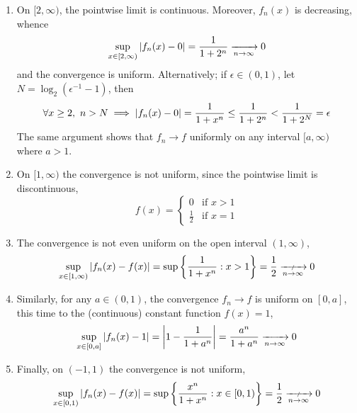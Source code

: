 \begin{examples}{}{}
\begin{enumerate}
	  \begin{enumerate}
	    \item On $[2,\infty)$, the pointwise limit is continuous. Moreover, $f_n(x)$ is decreasing, whence
	    \[
	    	\sup_{x\in[2,\infty)}\left| f_n(x)-0\right|=\frac 1{1+2^n}\xrightarrow[n\to\infty]{} 0
	    \]
	    and the convergence is uniform. Alternatively; if $\epsilon\in (0,1)$, let $N=\log_2(\epsilon^{-1}-1)$, then
	    \[
	    	\forall x\ge 2,\ n>N
	    	\implies \left| f_n(x)-0\right|=\frac 1{1+x^n}
	    	\le \frac 1{1+2^n}<\frac 1{1+2^N}=\epsilon
	    \]
	    The same argument shows that $f_n\to f$ uniformly on any interval $[a,\infty)$ where $a>1$.
	    \item On $[1,\infty)$ the convergence is not uniform, since the pointwise limit is discontinuous,
			\[
				f(x)=
				\begin{cases}
	    		0&\text{if }x>1\\
	    		\frac 12&\text{if }x=1
	    	\end{cases}
	    \]
	   	\item The convergence is not even uniform on the open interval $(1,\infty)$,
	    \[
	    	\sup_{x\in[1,\infty)}\nm{f_n(x)-f(x)}
	    	=\sup\left\{\frac 1{1+x^n}:x>1 \right\}
	    	=\frac 12\nxrightarrow{n\to\infty} 0
	    \]
	    \item Similarly, for any $a\in(0,1)$, the convergence $f_n\to f$ is uniform on $[0,a]$, this time to the (continuous) constant function $f(x)=1$,
	    \[
	    	\sup_{x\in[0,a]}\left| f_n(x)-1\right|
	    	=\left| 1-\frac 1{1+a^n}\right|
	    	=\frac{a^n}{1+a^n}
	    	\xrightarrow[n\to\infty]{} 0
	    \]
	    \item Finally, on $(-1,1)$ the convergence is not uniform,
	    \[
	    	\sup_{x\in[0,1)}\nm{f_n(x)-f(x)}
	    	=\sup\left\{\frac{x^n}{1+x^n}:x\in[0,1) \right\}
	    	=\frac 12\nxrightarrow{n\to\infty} 0
	    \]
	  \end{enumerate}
	\end{enumerate}
\end{examples}


